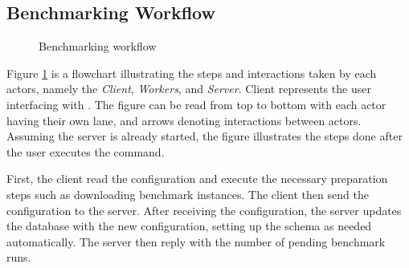\subsection{Benchmarking Workflow}
\begin{figure}
    \centering
    \caption{Benchmarking workflow}
    \label{fig:swimlane}
\end{figure}

Figure \ref{fig:swimlane} is a flowchart illustrating the steps and interactions taken by each actors, namely the \emph{Client}, \emph{Workers}, and \emph{Server}.
Client represents the user interfacing with \OurBenchmarkingTool.
The figure can be read from top to bottom with each actor having their own lane, and arrows denoting interactions between actors.
Assuming the server is already started, the figure illustrates the steps done after the user executes the  command.

First, the client read the configuration and execute the necessary preparation steps such as downloading benchmark instances.
The client then send the configuration to the server.
After receiving the configuration, the server updates the database with the new configuration, setting up the schema as needed automatically.
The server then reply with the number of pending benchmark runs.

